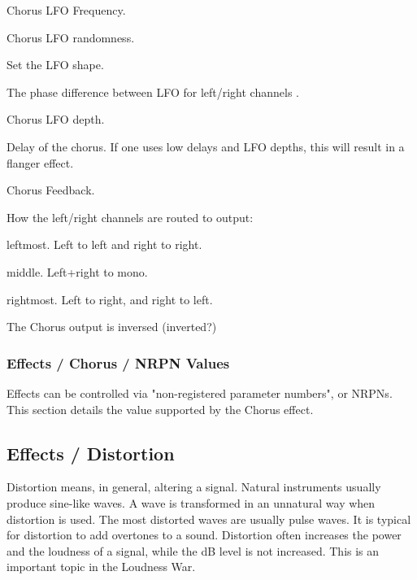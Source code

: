    \setcounter{ItemCounter}{0}      %

   Chorus LFO Frequency.

   Chorus LFO randomness.

   Set the LFO shape.

   The phase difference between LFO for left/right channels .

   Chorus LFO depth.

   Delay of the chorus.
   If one uses low delays and LFO depths, this will result in a flanger
   effect.

   Chorus Feedback.

   How the left/right channels are routed to output:

      \begin{enumber}
         \item leftmost. Left to left and right to right.
         \item middle. Left+right to mono.
         \item rightmost. Left to right, and right to left.
      \end{enumber}

   The Chorus output is inversed (inverted?)

\subsubsection{Effects / Chorus / NRPN Values}
\label{subsubsec:effects_edit_chorus_nrpn}

Effects can be controlled via "non-registered parameter numbers", or NRPNs.
This section details the value supported by the Chorus effect.

\subsection{Effects / Distortion}
\label{subsec:effects_edit_distortion}

   Distortion means, in general, altering a signal. Natural instruments
   usually produce sine-like waves. A wave is transformed in an unnatural way
   when distortion is used. The most distorted waves are usually pulse waves.
   It is typical for distortion to add overtones to a sound. Distortion often
   increases the power and the loudness of a signal, while the dB level is
   not increased. This is an important topic in the Loudness War.

